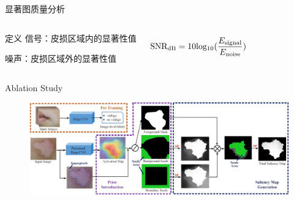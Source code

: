 \begin{frame}{显著图质量分析}
\begin{columns}[c]
\vspace{-.4cm}

\begin{block}{定义}\small
信号：皮损区域内的显著性值

噪声：皮损区域外的显著性值
\end{block}

\vspace{-.2cm}

\begin{equation}\small
\mathrm{SNR_{dB}}=10\mathrm{log_{10}}(\frac{E_{\mathrm{signal}}}{E_{\mathrm{noise}}}) \nonumber
\end{equation}
\end{columns}
\end{frame}
\begin{frame}{Ablation Study}
\begin{figure}
    \centering
    \includegraphics[width=0.9\linewidth]{figures/CNNandSuperPixelModelGraph3.jpg}
\end{figure}
\vfill
\begin{table}[]
\label{tab:ablation}
\begin{center}
%
\end{center}
\end{table}%
\end{frame}
